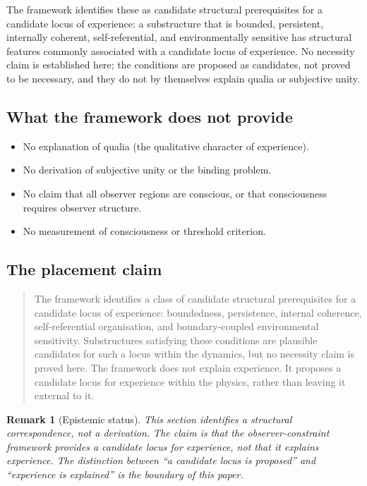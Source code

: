 \documentclass[12pt]{article}
\newtheorem{remark}[theorem]{Remark}
\begin{document}
The framework identifies these as candidate structural prerequisites for a candidate locus of experience: a substructure that is bounded, persistent, internally coherent, self-referential, and environmentally sensitive has structural features commonly associated with a candidate locus of experience. No necessity claim is established here; the conditions are proposed as candidates, not proved to be necessary, and they do not by themselves explain qualia or subjective unity.

\subsection{What the framework does not provide}

\begin{itemize}
    \item No explanation of qualia (the qualitative character of experience).
    \item No derivation of subjective unity or the binding problem.
    \item No claim that all observer regions are conscious, or that consciousness requires observer structure.
    \item No measurement of consciousness or threshold criterion.
\end{itemize}

\subsection{The placement claim}

\begin{quote}
The framework identifies a class of candidate structural prerequisites for a candidate locus of experience: boundedness, persistence, internal coherence, self-referential organisation, and boundary-coupled environmental sensitivity. Substructures satisfying these conditions are plausible candidates for such a locus within the dynamics, but no necessity claim is proved here. The framework does not explain experience. It proposes a candidate locus for experience within the physics, rather than leaving it external to it.
\end{quote}

\begin{remark}[Epistemic status]
This section identifies a structural correspondence, not a derivation. The claim is that the observer-constraint framework provides a \textit{candidate locus} for experience, not that it explains experience. The distinction between ``a candidate locus is proposed'' and ``experience is explained'' is the boundary of this paper.
\end{remark}
\end{document}
